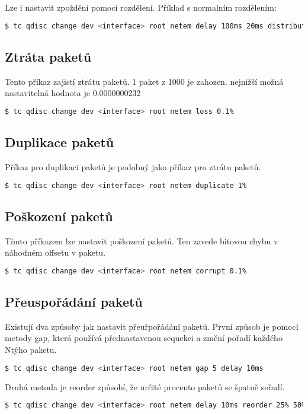 Lze i nastavit zpoždění pomocí rozdělení. Příklad s normalním rozdělením:
\begin{lstlisting}[language=bash]
    $ tc qdisc change dev <interface> root netem delay 100ms 20ms distribution normal
\end{lstlisting}

\subsection*{Ztráta paketů}
Tento příkaz zajistí ztrátu paketů. 1 paket z 1000 je zahozen. nejnižší možná nastavitelná hodnota je 0.0000000232%
\begin{lstlisting}[language=bash]
    $ tc qdisc change dev <interface> root netem loss 0.1%
\end{lstlisting}

\subsection*{Duplikace paketů}
Příkaz pro duplikaci paketů je podobný jako příkaz pro ztrátu paketů.
\begin{lstlisting}[language=bash]
    $ tc qdisc change dev <interface> root netem duplicate 1%
\end{lstlisting}

\subsection*{Poškození paketů}
Tímto příkazem lze nastavit poškození paketů. Ten zavede bitovou chybu v náhodném offsetu v paketu.
\begin{lstlisting}[language=bash]
    $ tc qdisc change dev <interface> root netem corrupt 0.1%
\end{lstlisting}

\subsection*{Přeuspořádání paketů}
Existují dva způsoby jak nastavit přeuřpořádání paketů.
První způsob je pomocí metody gap, která používá přednastavenou sequekci a změní pořadí každého Ntýho paketu.
\begin{lstlisting}[language=bash]
    $ tc qdisc change dev <interface> root netem gap 5 delay 10ms
\end{lstlisting}
Druhá metoda je reorder způsobí, že určité procento paketů se špatně seřadí.
\begin{lstlisting}[language=bash]
    $ tc qdisc change dev <interface> root netem delay 10ms reorder 25% 50%
\end{lstlisting}

